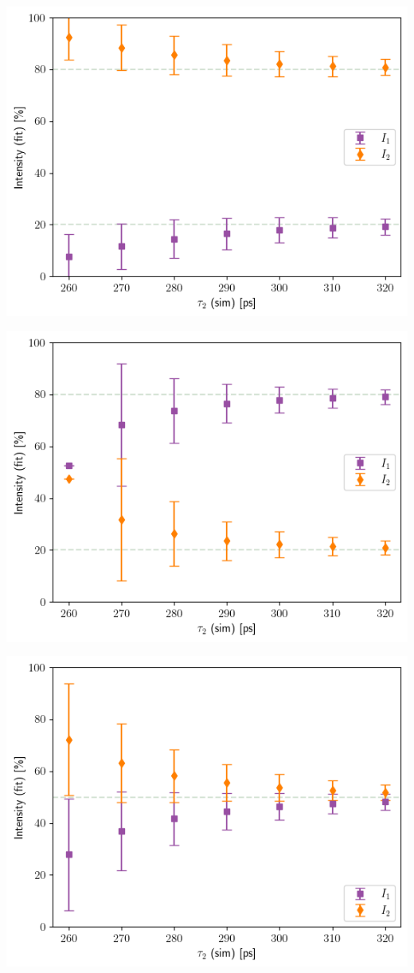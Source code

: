 \begin{minipage}{.5\linewidth}
    \centering
    \includegraphics[width=\linewidth]{Batch 3/regular IRF/tau1 220/output/plotfin/2080.png}
    \label{fig:220-2080}
\end{minipage}
\begin{minipage}{.5\linewidth}
    \centering
    \includegraphics[width=\linewidth]{Batch 3/regular IRF/tau1 220/output/plotfin/8020.png}
    \label{fig:220-8020}
\end{minipage}
\begin{minipage}{\linewidth}
    \centering
    \includegraphics[width=.5\linewidth]{Batch 3/regular IRF/tau1 220/output/plotfin/5050.png}
    \label{fig:220-5050}
\end{minipage}


